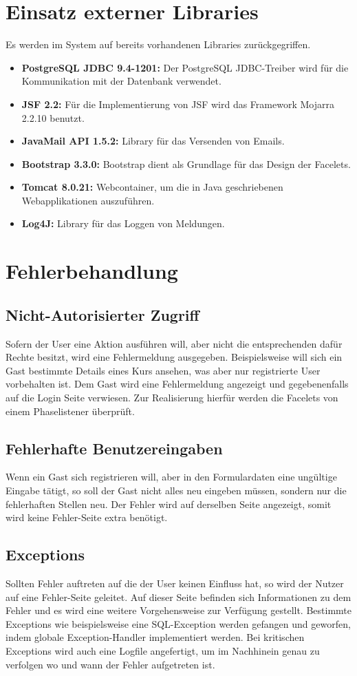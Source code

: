 \section{Einsatz externer Libraries}
Es werden im System auf bereits vorhandenen Libraries zurückgegriffen.
	\begin{itemize}
		\item \textbf{PostgreSQL JDBC 9.4-1201:} Der PostgreSQL JDBC-Treiber wird für die Kommunikation mit der Datenbank verwendet.
		\item \textbf{JSF 2.2:} Für die Implementierung von JSF wird das Framework Mojarra 2.2.10 benutzt.
		\item \textbf{JavaMail API 1.5.2:} Library für das Versenden von Emails.
		\item \textbf{Bootstrap 3.3.0:} Bootstrap dient als Grundlage für das Design der Facelets.
		\item \textbf{Tomcat 8.0.21:} Webcontainer, um die in Java geschriebenen Webapplikationen auszuführen.
		\item \textbf{Log4J:} Library für das Loggen von Meldungen.
	\end{itemize}
\section{Fehlerbehandlung}
	\subsection{Nicht-Autorisierter Zugriff}
	Sofern der User eine Aktion ausführen will, aber nicht die entsprechenden dafür Rechte besitzt, wird eine Fehlermeldung ausgegeben. Beispielsweise will sich ein Gast bestimmte Details eines Kurs ansehen, was aber nur registrierte User vorbehalten ist. Dem Gast wird eine Fehlermeldung angezeigt und gegebenenfalls auf die Login Seite verwiesen. Zur Realisierung hierfür werden die Facelets von einem Phaselistener überprüft.
	\subsection{Fehlerhafte Benutzereingaben}
	Wenn ein Gast sich registrieren will, aber in den Formulardaten eine ungültige Eingabe tätigt, so soll der Gast nicht alles neu eingeben müssen, sondern nur die fehlerhaften Stellen neu. Der Fehler wird auf derselben Seite angezeigt, somit wird keine Fehler-Seite extra benötigt.
	\subsection{Exceptions}
	Sollten Fehler auftreten auf die der User keinen Einfluss hat, so wird der Nutzer auf eine Fehler-Seite geleitet. Auf dieser Seite befinden sich Informationen zu dem Fehler und es wird eine weitere Vorgehensweise zur Verfügung gestellt. Bestimmte Exceptions wie beispielsweise eine SQL-Exception werden gefangen und geworfen, indem globale Exception-Handler implementiert werden. Bei kritischen Exceptions wird auch eine Logfile angefertigt, um im Nachhinein genau zu verfolgen wo und wann der Fehler aufgetreten ist.
